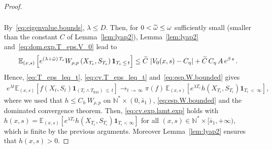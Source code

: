 \documentclass[AHL,Unicode,longabstracts,published]{cedram}
\newcommand{\NN}{\mathbb{N}}
\newcommand{\EE}{\mathbb{E}}
\newcommand{\Text}{T_{\mathrm{Ext}}}
\newcommand{\1}{\mathbf{1}}
\let\oldtilde\tilde
\renewcommand*{\tilde}[1]{\mathchoice{\widetilde{#1}}{\widetilde{#1}}{\oldtilde{#1}}{\oldtilde{#1}}}
\begin{document}
\begin{proof}
\begin{multline}
\begin{aligned}
\end{aligned}
\end{multline}
By~\eqref{eq:eigenvalue.bounds}, $\lambda \leq D$. Then, for $0<\tilde \omega\leq \omega$ sufficiently small (smaller than the constant $C$ of Lemma~\ref{lem:lyap2}), Lemma~\ref{lem:lyap2} and~\eqref{eq:dom.exp.T_eps.V_0} lead to
\begin{align}\label{eq:esp.W.bounded}
\EE_{(x,s)} \left[e^{\left(\lambda+\tilde\omega\right)\, T_\epsilon}W_{\rho,p}\left(X_{T_\epsilon},S_{T_\epsilon}\right) \1_{T_\epsilon\,\leq\,t} \right]
\leq \tilde C\,\left|V_0(x,s)-C_\eta\right| +\tilde C\,C_\eta\, A\,e^{\beta\,s}\,.
\end{align}
Hence, \eqref{eq:T_eps_leq_t}, \eqref{eq:cv.T_eps_leq_t} and~\eqref{eq:esp.W.bounded} gives
\begin{align*}
e^{\lambda t}\EE_{(x,s)} \left[f(X_t,S_t)\1_{\left(T_\epsilon\wedge \Text\right)\,\leq\,t}\right]
\longrightarrow_{t\,\to\,\infty} \pi(f) \,\EE_{(x,s)} \left[e^{\lambda T_\epsilon} h\left(X_{T_\epsilon},S_{T_\epsilon}\right) \1_{T_\epsilon\,<\,\infty}\right],
\end{align*}
where we used that $h\leq C_h\, W_{\rho,p}$ on $\NN^*\times (0,\bar s_1)$, \eqref{eq:esp.W.bounded} and the dominated convergence theorem. Then, \eqref{eq:cv.exp.lamt.exp} holds with $h(x,s)=\EE_{(x,s)} [e^{\lambda T_\epsilon} h(X_{T_\epsilon},S_{T_\epsilon}) \1_{T_\epsilon < \infty}]$ for all $(x,s) \in \NN^* \times [\bar s_1,+\infty)$, which is finite by the previous arguments. Moreover Lemma~\ref{lem:lyap2} ensures that $h(x,s)>0$.




\end{proof}
\end{document}
